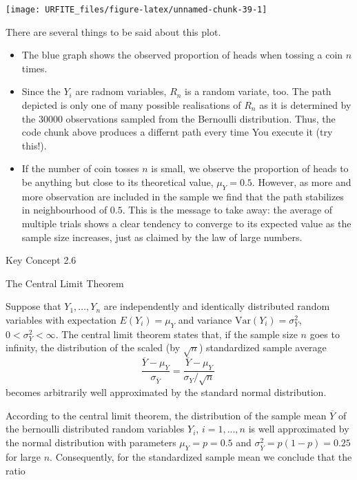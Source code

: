 \documentclass[]{book}
\theoremstyle{definition}
\theoremstyle{definition}
\theoremstyle{definition}
\theoremstyle{remark}
\begin{document}
\begin{center}\texttt{[image: URFITE\_files/figure-latex/unnamed-chunk-39-1]} \end{center}

There are several things to be said about this plot.

\begin{itemize}
\item
  The blue graph shows the observed proportion of heads when tossing a
  coin \(n\) times.
\item
  Since the \(Y_i\) are radnom variables, \(R_n\) is a random variate,
  too. The path depicted is only one of many possible realisations of
  \(R_n\) as it is determined by the \(30000\) observations sampled from
  the Bernoulli distribution. Thus, the code chunk above produces a
  differnt path every time You execute it (try this!).
\item
  If the number of coin tosses \(n\) is small, we observe the proportion
  of heads to be anything but close to its theoretical value,
  \(\mu_Y = 0.5\). However, as more and more observation are included in
  the sample we find that the path stabilizes in neighbourhood of
  \(0.5\). This is the message to take away: the average of multiple
  trials shows a clear tendency to converge to its expected value as the
  sample size increases, just as claimed by the law of large numbers.
\end{itemize}

Key Concept 2.6

The Central Limit Theorem

Suppose that \(Y_1,\dots,Y_n\) are independently and identically
distributed random variables with expectation \(E(Y_i)=\mu_Y\) and
variance \(\text{Var}(Y_i)=\sigma^2_Y\), \(0<\sigma^2_Y<\infty\). The
central limit theorem states that, if the sample size \(n\) goes to
infinity, the distribution of the scaled (by \(\sqrt{n}\)) standardized
sample average
\[ \frac{\overline{Y} - \mu_Y}{\sigma_{\overline{Y}}} = \frac{\overline{Y} - \mu_Y}{\sigma_Y/\sqrt{n}} \ \]
becomes arbitrarily well approximated by the standard normal
distribution.

According to the central limit theorem, the distribution of the sample
mean \(\overline{Y}\) of the bernoulli distributed random variables
\(Y_i\), \(i=1,...,n\) is well approximated by the normal distribution
with parameters \(\mu_Y=p=0.5\) and
\(\sigma^2_{\overline{Y}} = p(1-p) = 0.25\) for large \(n\).
Consequently, for the standardized sample mean we conclude that the
ratio
\end{document}
